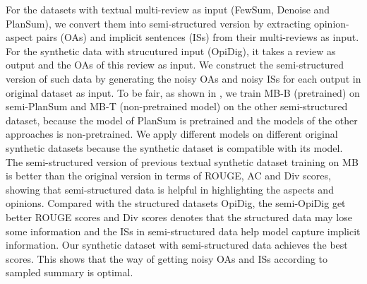 For the datasets with textual multi-review as input (FewSum, Denoise and PlanSum), 
we convert them into semi-structured version by extracting opinion-aspect pairs (OAs) and implicit sentences (ISs)
from their multi-reviews as input.
For the synthetic data with strucutured input (OpiDig),
it takes a review as output and the OAs of this review as input.
We construct the semi-structured version of such data
by generating the noisy OAs and noisy ISs for each output in original dataset as input.
To be fair, as shown in , we train MB-B (pretrained) on semi-PlanSum and MB-T (non-pretrained model) on the other semi-structured dataset, because the model of PlanSum is pretrained and the models of the other approaches is non-pretrained.
We apply different models on different original synthetic datasets because
the synthetic dataset is compatible with its model.
The semi-structured version of previous textual synthetic dataset training on MB
is better than the original version in terms of ROUGE, AC and Div scores,
showing that semi-structured data
is helpful in highlighting the aspects and opinions.
Compared with the structured datasets OpiDig, the semi-OpiDig get better ROUGE scores and Div scores denotes that the structured data may lose some information and the ISs in semi-structured data help model capture implicit information.
Our synthetic dataset with semi-structured data
achieves the best scores. This shows that
the way of getting noisy OAs and ISs according to sampled summary 
is optimal.

 

